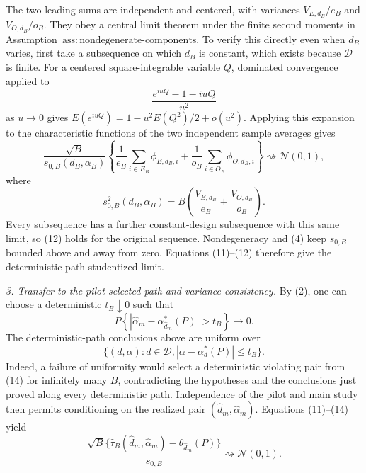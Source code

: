 The two leading sums are independent and centered, with variances \(V_{E,d_B}/e_B\) and \(V_{O,d_B}/o_B\).  They obey a central limit theorem under the finite second moments in Assumption~\(\mathrm{ass{:}nondegenerate\text{-}components}\).  To verify this directly even when \(d_B\) varies, first take a subsequence on which \(d_B\) is constant, which exists because \(\mathcal D\) is finite.  For a centered square-integrable variable \(Q\), dominated convergence applied to
\[
 \frac{e^{iuQ}-1-iuQ}{u^2}
\]
as \(u\to0\) gives \(E(e^{iuQ})=1-u^2E(Q^2)/2+o(u^2)\).  Applying this expansion to the characteristic functions of the two independent sample averages gives
\[
 \frac{\sqrt B}{s_{0,B}(d_B,\alpha_B)}
 \left\{
 \frac1{e_B}\sum_{i\in E_B}\phi_{E,d_B,i}
 +\frac1{o_B}\sum_{i\in O_B}\phi_{O,d_B,i}
 \right\}
 \rightsquigarrow\mathcal N(0,1), \tag{12}
\]
where
\[
 s_{0,B}^2(d_B,\alpha_B)
 =B\left(\frac{V_{E,d_B}}{e_B}+\frac{V_{O,d_B}}{o_B}\right).
\]
Every subsequence has a further constant-design subsequence with this same limit, so (12) holds for the original sequence.  Nondegeneracy and (4) keep \(s_{0,B}\) bounded above and away from zero.  Equations (11)--(12) therefore give the deterministic-path studentized limit.

\emph{3. Transfer to the pilot-selected path and variance consistency.}
By (2), one can choose a deterministic \(t_B\downarrow0\) such that
\[
 P\left\{
 |\widehat\alpha_m-\alpha_{\widehat d_m}^*(P)|>t_B
 \right\}\longrightarrow0. \tag{13}
\]
The deterministic-path conclusions above are uniform over
\[
 \{(d,\alpha):d\in\mathcal D,
 |\alpha-\alpha_d^*(P)|\le t_B\}. \tag{14}
\]
Indeed, a failure of uniformity would select a deterministic violating pair from (14) for infinitely many \(B\), contradicting the hypotheses and the conclusions just proved along every deterministic path.  Independence of the pilot and main study then permits conditioning on the realized pair \((\widehat d_m,\widehat\alpha_m)\).  Equations (11)--(14) yield
\[
 \frac{\sqrt B\{\widehat\tau_B(\widehat d_m,\widehat\alpha_m)
 -\theta_{\widehat d_m}(P)\}}{s_{0,B}}
 \rightsquigarrow\mathcal N(0,1). \tag{15}
\]

